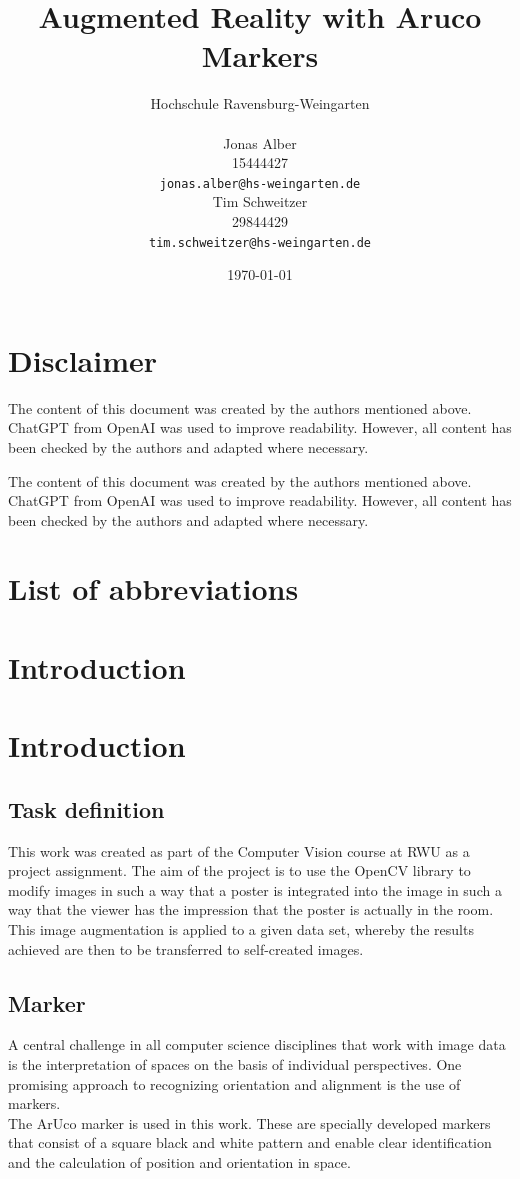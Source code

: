 \documentclass[a4paper,twocolumn]{article}
\title{Augmented Reality with Aruco Markers}
\author{
    Hochschule Ravensburg-Weingarten \\[1em] %
    \begin{minipage}[t]{0.45\textwidth} %
        \centering
        Jonas Alber \\ %
        15444427\\
        \texttt{jonas.alber@hs-weingarten.de} %
    \end{minipage}
    \hfill
    \begin{minipage}[t]{0.45\textwidth} %
        \centering
        Tim Schweitzer \\  29844429 \\ %
        \texttt{tim.schweitzer@hs-weingarten.de} %
    \end{minipage}
}
\date{\today}
\begin{document}
\maketitle

\section*{Disclaimer}
The content of this document was created by the authors mentioned above. ChatGPT from OpenAI was used to improve readability. However, all content has been checked by the authors and adapted where necessary.

The content of this document was created by the authors mentioned above. ChatGPT from OpenAI was used to improve readability. However, all content has been checked by the authors and adapted where necessary.

\section*{List of abbreviations}
\begin{acronym}[RWU]
\end{acronym}

\section{Introduction}

\section{Introduction}

\subsection{Task definition}
This work was created as part of the Computer Vision course at \ac{RWU} as a project assignment. The aim of the project is to use the OpenCV library to modify images in such a way that a poster is integrated into the image in such a way that the viewer has the impression that the poster is actually in the room.
\\
This image augmentation is applied to a given data set, whereby the results achieved are then to be transferred to self-created images.

\subsection{Marker}
A central challenge in all computer science disciplines that work with image data is the interpretation of spaces on the basis of individual perspectives. One promising approach to recognizing orientation and alignment is the use of markers.
\\
The ArUco marker is used in this work. These are specially developed markers that consist of a square black and white pattern and enable clear identification and the calculation of position and orientation in space. \cite{aruco1}
\end{document}
